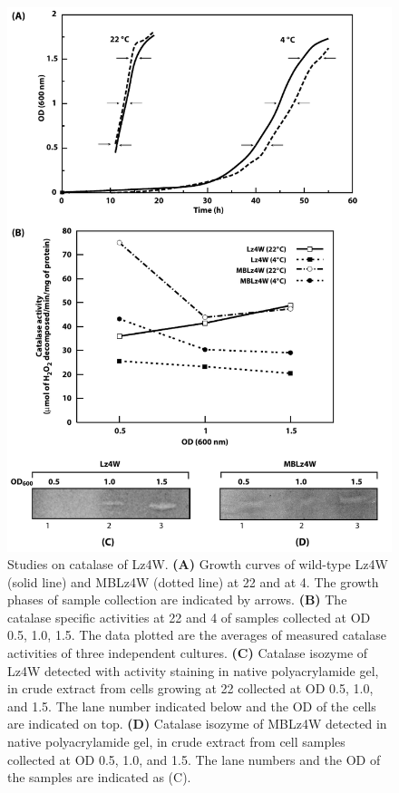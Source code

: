 \begin{figure}[tbp]
\centering
\includegraphics{figures/chap6_catalase}
\caption[Studies on catalase of Lz4W]{Studies on catalase of Lz4W.
\textbf{(A)} Growth curves of wild-type Lz4W (solid line) and
MBLz4W (dotted line) at 22\dg{} and at 4\dg{}\@. The growth phases
of sample collection are indicated by arrows. \textbf{(B)} The
catalase specific activities at 22\dg{} and 4\dg{} of samples
collected at OD 0.5, 1.0, 1.5. The data plotted are the
averages of measured catalase activities of three independent
cultures. \textbf{(C)} Catalase isozyme of Lz4W detected with
activity staining in native polyacrylamide gel, in crude extract
from cells growing at 22\dg{} collected at OD 0.5, 1.0,
and 1.5. The lane number indicated below and the OD of
the cells are indicated on top. \textbf{(D)} Catalase isozyme of
MBLz4W detected in native polyacrylamide gel, in crude extract
from cell samples collected at OD 0.5, 1.0, and 1.5.
The lane numbers and the OD of the samples are indicated as (C).}
\label{chap6:catalase}
\end{figure}

